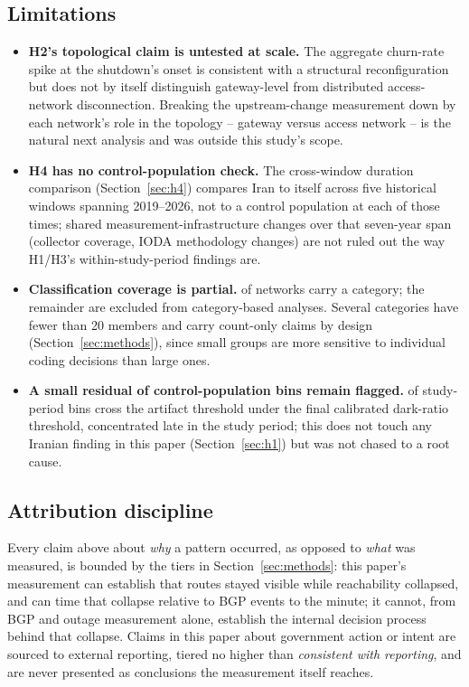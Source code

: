 \subsection{Limitations}

\begin{itemize}
\item \textbf{H2's topological claim is untested at scale.} The aggregate
  churn-rate spike at the shutdown's onset is consistent with a structural
  reconfiguration but does not by itself distinguish gateway-level from
  distributed access-network disconnection. Breaking the upstream-change
  measurement down by each network's role in the topology -- gateway versus
  access network -- is the natural next analysis and was outside this
  study's scope.
\item \textbf{H4 has no control-population check.} The cross-window
  duration comparison (Section~\ref{sec:h4}) compares Iran to itself across
  five historical windows spanning 2019--2026, not to a control population
  at each of those times; shared measurement-infrastructure changes over
  that seven-year span (collector coverage, IODA methodology changes) are
  not ruled out the way H1/H3's within-study-period findings are.
\item \textbf{Classification coverage is partial.} \nClassified{} of
  \nIrAsns{} networks carry a category; the remainder are excluded from
  category-based analyses. Several categories have fewer than 20 members
  and carry count-only claims by design (Section~\ref{sec:methods}), since
  small groups are more sensitive to individual coding decisions than
  large ones.
\item \textbf{A small residual of control-population bins remain flagged.}
  \nControlArtifactBins{} of \nControlBins{} study-period bins cross the
  artifact threshold under the final calibrated dark-ratio threshold,
  concentrated late in the study period; this does not touch any Iranian
  finding in this paper (Section~\ref{sec:h1}) but was not chased to a root
  cause.
\end{itemize}

\subsection{Attribution discipline}

Every claim above about \emph{why} a pattern occurred, as opposed to
\emph{what} was measured, is bounded by the tiers in
Section~\ref{sec:methods}: this paper's measurement can establish that
routes stayed visible while reachability collapsed, and can time that
collapse relative to BGP events to the minute; it cannot, from BGP and
outage measurement alone, establish the internal decision process behind
that collapse. Claims in this paper about government action or intent are
sourced to external reporting, tiered no higher than \emph{consistent with
reporting}, and are never presented as conclusions the measurement itself
reaches.
